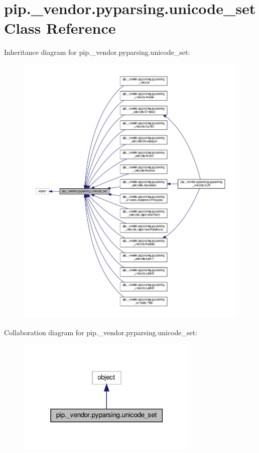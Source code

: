 \hypertarget{classpip_1_1__vendor_1_1pyparsing_1_1unicode__set}{}\section{pip.\+\_\+vendor.\+pyparsing.\+unicode\+\_\+set Class Reference}
\label{classpip_1_1__vendor_1_1pyparsing_1_1unicode__set}


Inheritance diagram for pip.\+\_\+vendor.\+pyparsing.\+unicode\+\_\+set\+:
\nopagebreak
\begin{figure}[H]
\begin{center}
\leavevmode
\includegraphics[width=350pt]{classpip_1_1__vendor_1_1pyparsing_1_1unicode__set__inherit__graph}
\end{center}
\end{figure}


Collaboration diagram for pip.\+\_\+vendor.\+pyparsing.\+unicode\+\_\+set\+:
\nopagebreak
\begin{figure}[H]
\begin{center}
\leavevmode
\includegraphics[width=247pt]{classpip_1_1__vendor_1_1pyparsing_1_1unicode__set__coll__graph}
\end{center}
\end{figure}
